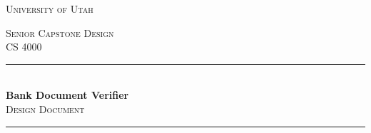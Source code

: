 \begin{titlepage}

\newcommand{\HRule}{\rule{\linewidth}{0.5mm}} %

\center %
 

\textsc{\LARGE University of Utah}\\[0.5cm] %

\begin{figure}[h]
    \centering
    
    \label{fig:u_logo}
\end{figure}

\vspace{0.5cm}
\textsc{\Large Senior Capstone Design}\\[0.5cm] %
\textsc{\large CS 4000}\\[0.5cm] %




\HRule \\[0.5cm]
{\LARGE \textbf{Bank Document Verifier}}\\[0.25cm] %
{\large \textsc{Design Document}}\\[0.25cm]

\begin{figure}[h]
    \centering
    \hspace{8mm}
    
    \label{fig:logo}
\end{figure}
\HRule \\[0.5cm]




\end{titlepage}
